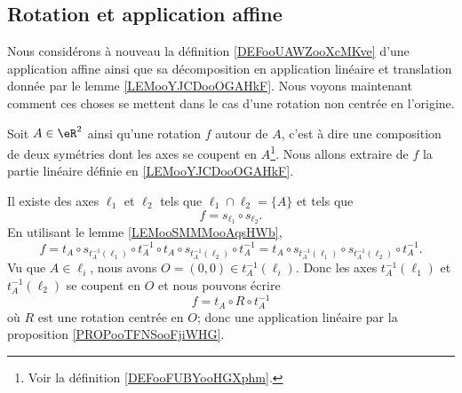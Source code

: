 \subsection{Rotation et application affine}

Nous considérons à nouveau la définition \ref{DEFooUAWZooXcMKve} d'une application affine ainsi que sa décomposition en application linéaire et translation donnée par le lemme \ref{LEMooYJCDooOGAHkF}. Nous voyons maintenant comment ces choses se mettent dans le cas d'une rotation non centrée en l'origine.

\begin{example}
    Soit \( A\in \eR^2\) ainsi qu'une rotation \( f\) autour de \( A\), c'est à dire une composition de deux symétries dont les axes se coupent en \( A\)\footnote{Voir la définition \ref{DEFooFUBYooHGXphm}.}. Nous allons extraire de \( f\) la partie linéaire définie en \ref{LEMooYJCDooOGAHkF}.

    Il existe des axes \( \ell_1\) et \( \ell_2\) tels que \( \ell_1\cap\ell_2=\{ A \}\) et tels que
    \begin{equation}
        f=s_{\ell_1}\circ s_{\ell_2}.
    \end{equation}
    En utilisant le lemme \ref{LEMooSMMMooAqsHWb},
    \begin{equation}
        f=t_A\circ s_{t^{-1}_A(\ell_1)}\circ t_A^{-1}\circ t_A\circ s_{t_A^{-1}(\ell_2)}\circ t_A^{-1}=t_A\circ s_{t^{-1}_A(\ell_1)}\circ s_{t_A^{-1}(\ell_2)}\circ t_A^{-1}.
    \end{equation}
    Vu que \( A\in\ell_i\), nous avons \( O=(0,0)\in t_A^{-1}(\ell_i)\). Donc les axes \( t_A^{-1}(\ell_1)\) et \( t_A^{-1}(\ell_2)\) se coupent en \( O\) et nous pouvons écrire
    \begin{equation}        %
        f=t_A\circ R\circ t_A^{-1}
    \end{equation}
    où \( R\) est une rotation centrée en \( O\); donc une application linéaire par la proposition \ref{PROPooTFNSooFjiWHG}.


\end{example}
